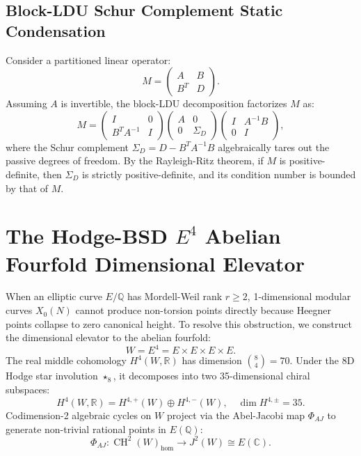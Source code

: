 \documentclass[11pt,a4paper]{article}
\theoremstyle{definition}
\begin{document}
\subsection{Block-LDU Schur Complement Static Condensation}
Consider a partitioned linear operator:
\begin{equation}
M = \begin{pmatrix} A & B \\ B^T & D \end{pmatrix}.
\end{equation}
Assuming $A$ is invertible, the block-LDU decomposition factorizes $M$ as:
\begin{equation}
M = \begin{pmatrix} I & 0 \\ B^T A^{-1} & I \end{pmatrix}
\begin{pmatrix} A & 0 \\ 0 & \Sigma_D \end{pmatrix}
\begin{pmatrix} I & A^{-1} B \\ 0 & I \end{pmatrix},
\end{equation}
where the Schur complement $\Sigma_D = D - B^T A^{-1} B$ algebraically tares out the passive degrees of freedom. By the Rayleigh-Ritz theorem, if $M$ is positive-definite, then $\Sigma_D$ is strictly positive-definite, and its condition number is bounded by that of $M$.

\section{The Hodge-BSD $E^4$ Abelian Fourfold Dimensional Elevator}

When an elliptic curve $E/\mathbb{Q}$ has Mordell-Weil rank $r \ge 2$, 1-dimensional modular curves $X_0(N)$ cannot produce non-torsion points directly because Heegner points collapse to zero canonical height. To resolve this obstruction, we construct the dimensional elevator to the abelian fourfold:
\begin{equation}
W = E^4 = E \times E \times E \times E.
\end{equation}
The real middle cohomology $H^4(W, \mathbb{R})$ has dimension $\binom{8}{4} = 70$. Under the 8D Hodge star involution $\star_8$, it decomposes into two 35-dimensional chiral subspaces:
\begin{equation}
H^4(W, \mathbb{R}) = H^{4,+}(W) \oplus H^{4,-}(W), \quad \dim H^{4,\pm} = 35.
\end{equation}
Codimension-2 algebraic cycles on $W$ project via the Abel-Jacobi map $\Phi_{AJ}$ to generate non-trivial rational points in $E(\mathbb{Q})$:
\begin{equation}
\Phi_{AJ} : \operatorname{CH}^2(W)_{\mathrm{hom}} \longrightarrow J^2(W) \cong E(\mathbb{C}).
\end{equation}
\end{document}
